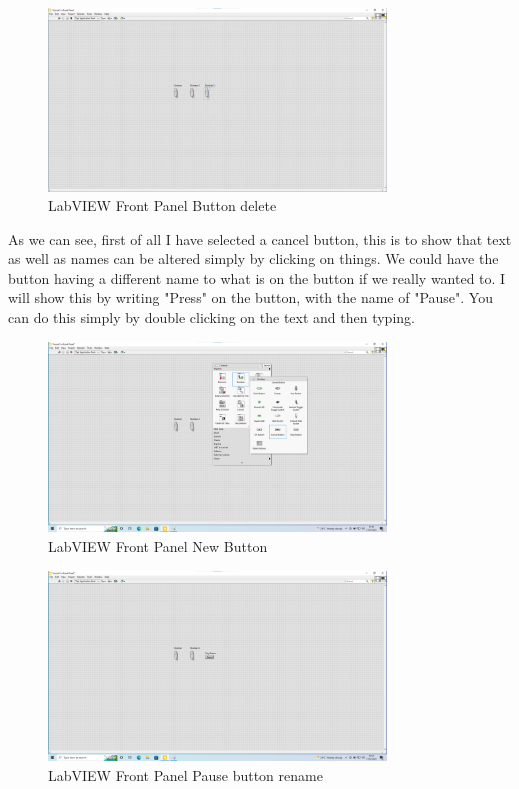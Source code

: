 \documentclass[a4paper,11pt]{report}
\begin{document}
\begin{figure}[H]
\centering
\includegraphics[width=0.8\textwidth]{screenshots/labview12}
\caption{LabVIEW Front Panel Button delete}
\end{figure}

As we can see, first of all I have selected a cancel button, this is to show that text as well as names can be altered simply by clicking on things. We could have the button having a different name to what is on the button if we really wanted to. I will show this by writing "Press" on the button, with the name of "Pause". You can do this simply by double clicking on the text and then typing.

\begin{figure}[H]
\centering
\includegraphics[width=0.8\textwidth]{screenshots/labview13}
\caption{LabVIEW Front Panel New Button}
\end{figure}

\begin{figure}[H]
\centering
\includegraphics[width=0.8\textwidth]{screenshots/labview14}
\caption{LabVIEW Front Panel Pause button rename}
\end{figure}
\end{document}
